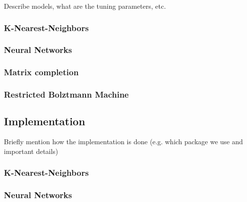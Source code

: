 \documentclass[bj, preprint]{imsart}
\begin{document}
Describe models, what are the tuning parameters, etc.

\subsubsection{K-Nearest-Neighbors}\label{subsubsec:method.models.knn}

\subsubsection{Neural Networks}\label{subsubsec:method.models.nn}

\subsubsection{Matrix completion}\label{subsubsec:method.models.svd}

\subsubsection{Restricted Bolztmann Machine}\label{subsubsec:method.models.rbm}







\subsection{Implementation}\label{subsec:method.impl}

Briefly mention how the implementation is done (e.g. which package we use and important details)

\subsubsection{K-Nearest-Neighbors}\label{subsubsec:method.impl.knn}

\subsubsection{Neural Networks}\label{subsubsec:method.impl.nn}
\end{document}
